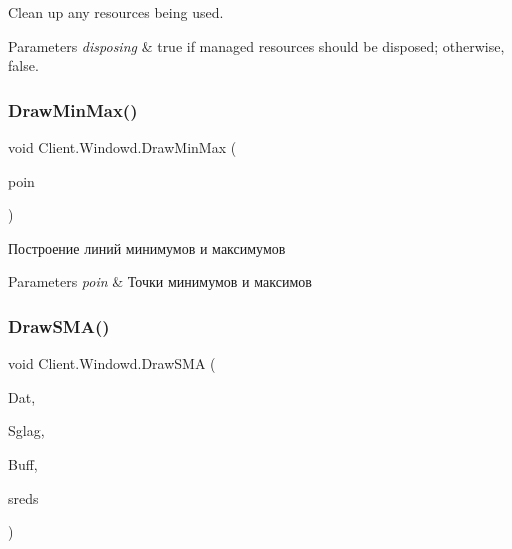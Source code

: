 Clean up any resources being used. 


\begin{DoxyParams}{Parameters}
{\em disposing} & true if managed resources should be disposed; otherwise, false.\\
\hline
\end{DoxyParams}
\hypertarget{class_client_1_1_windowd_a84177c165ee297b49e25c6b5da053c12}{}\label{class_client_1_1_windowd_a84177c165ee297b49e25c6b5da053c12} 
\subsubsection{\texorpdfstring{Draw\+Min\+Max()}{DrawMinMax()}}
{\footnotesize\ttfamily void Client.\+Windowd.\+Draw\+Min\+Max (\begin{DoxyParamCaption}\item[{List$<$ List$<$ double $>$$>$}]{poin }\end{DoxyParamCaption})\hspace{0.3cm}{\ttfamily [inline]}}



Построение линий минимумов и максимумов 


\begin{DoxyParams}{Parameters}
{\em poin} & Точки минимумов и максимов\\
\hline
\end{DoxyParams}
\hypertarget{class_client_1_1_windowd_ad43dbe14134a90f8cd6acf4da36e485c}{}\label{class_client_1_1_windowd_ad43dbe14134a90f8cd6acf4da36e485c} 
\subsubsection{\texorpdfstring{Draw\+S\+M\+A()}{DrawSMA()}}
{\footnotesize\ttfamily void Client.\+Windowd.\+Draw\+S\+MA (\begin{DoxyParamCaption}\item[{List$<$ Date\+Time $>$}]{Dat,  }\item[{int}]{Sglag,  }\item[{List$<$ double $>$}]{Buff,  }\item[{List$<$ double $>$}]{sreds }\end{DoxyParamCaption})\hspace{0.3cm}{\ttfamily [inline]}}



